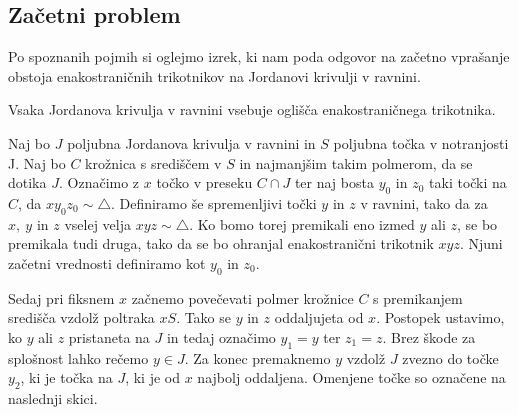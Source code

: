 \documentclass[mat1]{fmfdelo}
\begin{document}
\subsection{Začetni problem}
Po spoznanih pojmih si oglejmo izrek, ki nam poda odgovor na začetno vprašanje obstoja enakostraničnih trikotnikov na Jordanovi krivulji v ravnini.
\begin{izrek}\label{izr:zacetni}
Vsaka Jordanova krivulja v ravnini vsebuje oglišča enakostraničnega trikotnika.
\end{izrek}
\proof
Naj bo $J$ poljubna Jordanova krivulja v ravnini in $S$ poljubna točka v notranjosti J. Naj bo $C$ krožnica s središčem v $S$ in najmanjšim takim polmerom, da se dotika $J$. Označimo z $x$ točko v preseku $C \cap J$ ter naj bosta $y_0$ in $z_0$ taki točki na $C$, da $xy_0z_0 \sim \triangle$. Definiramo še spremenljivi točki $y$ in $z$ v ravnini, tako da za $x,\ y$ in $z$ vselej velja $xyz \sim \triangle$. Ko bomo torej premikali eno izmed $y$ ali $z$, se bo premikala tudi druga, tako da se bo ohranjal enakostranični trikotnik $xyz$. Njuni začetni vrednosti definiramo kot $y_0$ in $z_0$.

Sedaj pri fiksnem $x$ začnemo povečevati polmer krožnice $C$ s premikanjem središča vzdolž poltraka $xS$. Tako se $y$ in $z$ oddaljujeta od $x$. Postopek ustavimo, ko $y$ ali $z$ pristaneta na $J$ in tedaj označimo $y_1 = y$ ter $z_1 = z$. Brez škode za splošnost lahko rečemo $y \in J$. Za konec premaknemo $y$ vzdolž $J$ zvezno do točke $y_2$, ki je točka na $J$, ki je od $x$ najbolj oddaljena. Omenjene točke so označene na naslednji skici.

\begin{center}
\end{center}
\end{document}
